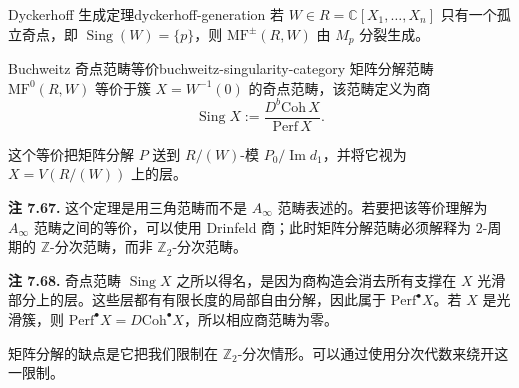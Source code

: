 \begin{theorem}{Dyckerhoff 生成定理}{dyckerhoff-generation}
若 $W\in R=\mathbb C[X_1,\ldots,X_n]$ 只有一个孤立奇点，即 $\operatorname{Sing}(W)=\{p\}$，则 $\mathrm{MF}^{\pm}(R,W)$ 由 $M_p$ 分裂生成。
\end{theorem}

\begin{theorem}{Buchweitz 奇点范畴等价}{buchweitz-singularity-category}
矩阵分解范畴 $\mathrm{MF}^{0}(R,W)$ 等价于簇 $X=W^{-1}(0)$ 的奇点范畴，该范畴定义为商
\[
  \operatorname{Sing}X:=\frac{D^b\mathrm{Coh}\,X}{\mathrm{Perf}\,X}.
\]
\end{theorem}
这个等价把矩阵分解 $P$ 送到 $R/(W)$-模 $P_0/\operatorname{Im}d_1$，并将它视为 $X=V(R/(W))$ 上的层。

\begin{note}\label{note:matrix-factorization-category-equivalence}
\textbf{注 7.67.} 这个定理是用三角范畴而不是 $A_\infty$ 范畴表述的。若要把该等价理解为 $A_\infty$ 范畴之间的等价，可以使用 Drinfeld 商；此时矩阵分解范畴必须解释为 $2$-周期的 $\mathbb Z$-分次范畴，而非 $\mathbb Z_2$-分次范畴。
\end{note}

\begin{note}\label{note:singularity-category-kills-smooth-locus}
\textbf{注 7.68.} 奇点范畴 $\operatorname{Sing}X$ 之所以得名，是因为商构造会消去所有支撑在 $X$ 光滑部分上的层。这些层都有有限长度的局部自由分解，因此属于 $\mathrm{Perf}^{\bullet}X$。若 $X$ 是光滑簇，则 $\mathrm{Perf}^{\bullet}X=D\mathrm{Coh}^{\bullet}X$，所以相应商范畴为零。
\end{note}

矩阵分解的缺点是它把我们限制在 $\mathbb Z_2$-分次情形。可以通过使用分次代数来绕开这一限制。

